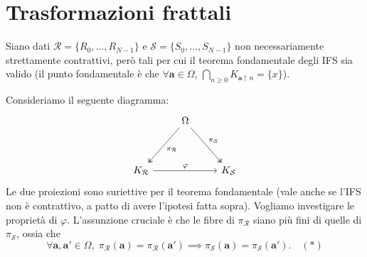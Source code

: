 \section{Trasformazioni frattali}

Siano dati $\mathcal R = \{R_{0},\dots,R_{N-1}\}$ e $\mathcal S = \{S_{0},\dots,S_{N-1}\}$ non necessariamente strettamente contrattivi, però tali per cui il teorema fondamentale degli IFS sia valido (il punto fondamentale è che $\forall\mathbf a\in\Omega$, $\bigcap_{n\geq0}K_{\mathbf a\upharpoonright n} = \{x\}$).

Consideriamo il seguente diagramma:
$$
\begin{tikzcd}
                                   & \Omega \arrow[ldd, "\pi_\mathcal R", two heads] \arrow[rdd, "\pi_\mathcal S", two heads] &              \\
                                   &                                                                    &              \\
K_\mathcal R \arrow[rr, "\varphi"] &                                                                    & K_\mathcal S
\end{tikzcd}
$$
Le due proiezioni sono suriettive per il teorema fondamentale (vale anche se l'IFS non è contrattivo, a patto di avere l'ipotesi fatta sopra). Vogliamo investigare le proprietà di $\varphi$. L'assunzione cruciale è che le fibre di $\pi_{\mathcal R}$ siano più fini di quelle di $\pi_{\mathcal S}$, ossia che 
$$\forall\mathbf a,\mathbf a'\in\Omega,\;\pi_{\mathcal R}(\mathbf a)= \pi_{\mathcal R}(\mathbf a')\implies \pi_{\mathcal S}(\mathbf a)= \pi_{\mathcal S}(\mathbf a').\quad (*)$$

